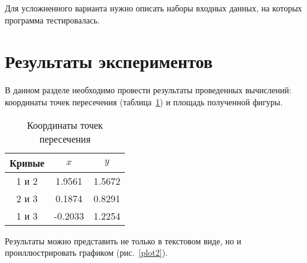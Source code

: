 \documentclass[a4paper,12pt,titlepage,finall]{article}
\begin{document}
Для усложненного варианта нужно описать наборы входных данных, на которых
программа тестировалась.

\newpage

\section{Результаты экспериментов}

В данном разделе необходимо провести результаты проведенных вычислений:
координаты точек пересечения (таблица~\ref{table1}) и площадь полученной фигуры.

\begin{table}[h]
\centering
\begin{tabular}{|c|c|c|}
\hline
Кривые & $x$ & $y$ \\
\hline
1 и 2 &  1.9561 & 1.5672 \\
2 и 3 &  0.1874 & 0.8291 \\
1 и 3 & -0.2033 & 1.2254 \\
\hline
\end{tabular}
\caption{Координаты точек пересечения}
\label{table1}
\end{table}


Результаты можно представить не только в текстовом виде, но и 
проиллюстрировать графиком (рис.~\ref{plot2}).
\end{document}
